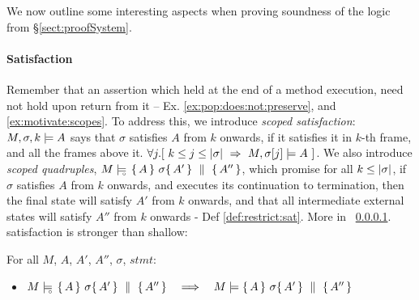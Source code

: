 

We now outline some interesting aspects when proving soundness of the logic from \S \ref{sect:proofSystem}.

 
\paragraph{\Scoped Satisfaction} 
\label{s:scoped:valid}


Remember that an assertion which held at the end of a method execution, need not hold upon return from it -- \cf Ex. \ref{ex:pop:does:not:preserve}, and   \ref{ex:motivate:scopes}. To address this, we introduce \emph{scoped satisfaction}: %
 $ M,\sigma ,{k} \models {A} $   says that $\sigma$ satisfies $A$ from $k$ onwards, if it satisfies it in $k$-th frame,  and all the frames above it. 
\ie $\forall j. [\  k\leq j \leq |\sigma| \ \Rightarrow \ M, \sigma[j] \models A \ ]$.
We also introduce \emph{scoped quadruples},  $M \models\!\!\!\!_{_{\circ}}\   \{\, A \, \}\ \sigma \{\, A' \, \} \, \,\parallel\,\, \{\, A'' \, \} $, which promise for all $k\leq |\sigma|$,  if $\sigma$ satisfies $A$ from $k$ onwards, and executes its continuation to termination, then the final state will satisfy $A'$ from $k$ onwards, and that  all intermediate external states will satisfy $A''$ from $k$ onwards - \cf Def \ref{def:restrict:sat}.
More in \A\ \ref{s:scoped:valid}.
\Scoped satisfaction is stronger than shallow:   
 
\begin{lemma}
For all $M$, $A$, $A'$, $A''$, $\sigma$, $stmt$:  
\begin{itemize}
\item
 $M \models\!\!\!\!_{_{\circ}}\   \{\, A \, \}\ \sigma \{\, A' \, \} \, \,\parallel\,\, \{\, A'' \, \}    \ \ \ \Longrightarrow \ \ \   M \models  \{\, A \, \}\ \sigma \{\, A' \, \} \, \,\parallel\,\, \{\, A'' \, \} $


\end{itemize}
\end{lemma}

